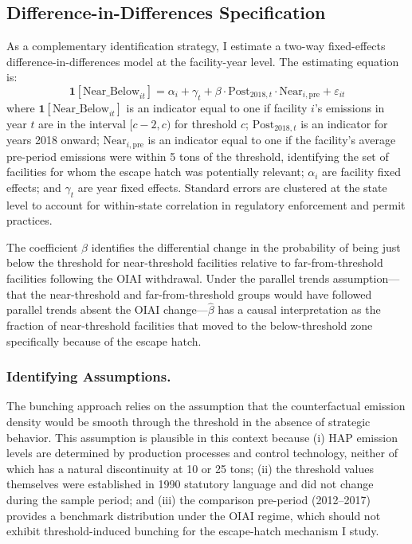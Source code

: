 \documentclass[12pt]{article}
\begin{document}
\subsection{Difference-in-Differences Specification}

As a complementary identification strategy, I estimate a two-way fixed-effects difference-in-differences model at the facility-year level. The estimating equation is:
\begin{equation}
\mathbf{1}[\text{Near\_Below}_{it}] = \alpha_i + \gamma_t + \beta \cdot \text{Post}_{2018,t} \cdot \text{Near}_{i,\text{pre}} + \varepsilon_{it}
\label{eq:did}
\end{equation}
where $\mathbf{1}[\text{Near\_Below}_{it}]$ is an indicator equal to one if facility $i$'s emissions in year $t$ are in the interval $[c-2, c)$ for threshold $c$; $\text{Post}_{2018,t}$ is an indicator for years 2018 onward; $\text{Near}_{i,\text{pre}}$ is an indicator equal to one if the facility's average pre-period emissions were within 5 tons of the threshold, identifying the set of facilities for whom the escape hatch was potentially relevant; $\alpha_i$ are facility fixed effects; and $\gamma_t$ are year fixed effects. Standard errors are clustered at the state level to account for within-state correlation in regulatory enforcement and permit practices.

The coefficient $\beta$ identifies the differential change in the probability of being just below the threshold for near-threshold facilities relative to far-from-threshold facilities following the OIAI withdrawal. Under the parallel trends assumption---that the near-threshold and far-from-threshold groups would have followed parallel trends absent the OIAI change---$\hat{\beta}$ has a causal interpretation as the fraction of near-threshold facilities that moved to the below-threshold zone specifically because of the escape hatch.

\subsubsection*{Identifying Assumptions.}
The bunching approach relies on the assumption that the counterfactual emission density would be smooth through the threshold in the absence of strategic behavior. This assumption is plausible in this context because (i) HAP emission levels are determined by production processes and control technology, neither of which has a natural discontinuity at 10 or 25 tons; (ii) the threshold values themselves were established in 1990 statutory language and did not change during the sample period; and (iii) the comparison pre-period (2012--2017) provides a benchmark distribution under the OIAI regime, which should not exhibit threshold-induced bunching for the escape-hatch mechanism I study.
\end{document}
